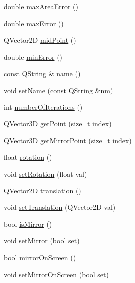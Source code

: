 \begin{DoxyCompactItemize}
\item 
double \hyperlink{classShipCAD_1_1DevelopedPatch_ae069aa101604151d0349805ffeb3902e}{max\+Area\+Error} ()
\item 
double \hyperlink{classShipCAD_1_1DevelopedPatch_a18ecaf8785655a33537ae155208b4c17}{max\+Error} ()
\item 
Q\+Vector2D \hyperlink{classShipCAD_1_1DevelopedPatch_a14dffbaa2c469eb825bb791c7c7cff42}{mid\+Point} ()
\item 
double \hyperlink{classShipCAD_1_1DevelopedPatch_a93c223c8eb2a39524cae8f71a863a15a}{min\+Error} ()
\item 
const Q\+String \& \hyperlink{classShipCAD_1_1DevelopedPatch_ab6918e553621440eef4efd9e4ae6fd2e}{name} ()
\item 
void \hyperlink{classShipCAD_1_1DevelopedPatch_a3ddb91773f49fa342f1fed811cd329f2}{set\+Name} (const Q\+String \&nm)
\item 
int \hyperlink{classShipCAD_1_1DevelopedPatch_a85be1d66371c43cedb1096bddf064e53}{number\+Of\+Iterations} ()
\item 
Q\+Vector3D \hyperlink{classShipCAD_1_1DevelopedPatch_a9cc5530b21f276b51279a2a46e261203}{get\+Point} (size\+\_\+t index)
\item 
Q\+Vector3D \hyperlink{classShipCAD_1_1DevelopedPatch_af7769b0032f7ca99b0790d1ae75d6d9f}{get\+Mirror\+Point} (size\+\_\+t index)
\item 
float \hyperlink{classShipCAD_1_1DevelopedPatch_a0a6aba001c536ddb4684d0c601ccc515}{rotation} ()
\item 
void \hyperlink{classShipCAD_1_1DevelopedPatch_ab91b09750cdae69f7f39b12980191f5e}{set\+Rotation} (float val)
\item 
Q\+Vector2D \hyperlink{classShipCAD_1_1DevelopedPatch_adce7adc7adf158ed0547a2dce708d8fe}{translation} ()
\item 
void \hyperlink{classShipCAD_1_1DevelopedPatch_a1c16b7311901ed24f90f5f99947438aa}{set\+Translation} (Q\+Vector2D val)
\item 
bool \hyperlink{classShipCAD_1_1DevelopedPatch_ae2a022f78ac1345f6ede335b32eadeb1}{is\+Mirror} ()
\item 
void \hyperlink{classShipCAD_1_1DevelopedPatch_a968873808a19604ecf04c9818f222fbb}{set\+Mirror} (bool set)
\item 
bool \hyperlink{classShipCAD_1_1DevelopedPatch_a58e6f298890172916af11e43ce9faedd}{mirror\+On\+Screen} ()
\item 
void \hyperlink{classShipCAD_1_1DevelopedPatch_a47e52017866102fdc68c2502dd56eb7f}{set\+Mirror\+On\+Screen} (bool set)

\end{DoxyCompactItemize}
